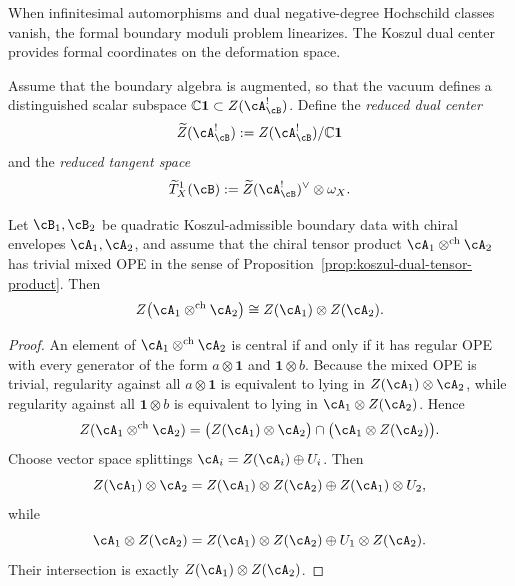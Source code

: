 \begin{remark}[Interpretation]
\label{rem:twisted-ym-central-formality-meaning}
When infinitesimal automorphisms and dual negative-degree Hochschild classes vanish, the formal boundary moduli problem linearizes. The Koszul dual center provides formal coordinates on the deformation space.
\end{remark}

\begin{definition}
\label{def:twisted-ym-reduced-center}
Assume that the boundary algebra is augmented, so that the vacuum defines a distinguished scalar subspace $\mathbb{C}\mathbf{1} \subset Z(\cA_{\cB}^{!})$. Define the \emph{reduced dual center}
\[
\widetilde Z(\cA_{\cB}^{!}) := Z(\cA_{\cB}^{!})/\mathbb{C}\mathbf{1}
\]
and the \emph{reduced tangent space}
\[
\widetilde T^1_X(\cB) := \widetilde Z(\cA_{\cB}^{!})^{\vee}\otimes \omega_X.
\]
\end{definition}

\begin{lemma}
\label{lem:twisted-ym-center-tensor}
Let $\cB_1,\cB_2$ be quadratic Koszul-admissible boundary data with chiral envelopes $\cA_1,\cA_2$, and assume that the chiral tensor product $\cA_1\otimes^{\mathrm{ch}}\cA_2$ has trivial mixed OPE\/ in the sense of Proposition~\ref{prop:koszul-dual-tensor-product}. Then
\[
Z\bigl(\cA_1\otimes^{\mathrm{ch}}\cA_2\bigr)
\cong
Z(\cA_1)\otimes Z(\cA_2).
\]
\end{lemma}

\begin{proof}
An element of $\cA_1\otimes^{\mathrm{ch}}\cA_2$ is central if and only if it has regular OPE with every generator of the form $a\otimes \mathbf{1}$ and $\mathbf{1}\otimes b$. Because the mixed OPE is trivial, regularity against all $a\otimes \mathbf{1}$ is equivalent to lying in $Z(\cA_1)\otimes \cA_2$, while regularity against all $\mathbf{1}\otimes b$ is equivalent to lying in $\cA_1\otimes Z(\cA_2)$. Hence
\[
Z(\cA_1\otimes^{\mathrm{ch}}\cA_2)
=
\bigl(Z(\cA_1)\otimes \cA_2\bigr)
\cap
\bigl(\cA_1\otimes Z(\cA_2)\bigr).
\]
Choose vector space splittings $\cA_i = Z(\cA_i)\oplus U_i$. Then
\[
Z(\cA_1)\otimes \cA_2
=
Z(\cA_1)\otimes Z(\cA_2)
\oplus
Z(\cA_1)\otimes U_2,
\]
while
\[
\cA_1\otimes Z(\cA_2)
=
Z(\cA_1)\otimes Z(\cA_2)
\oplus
U_1\otimes Z(\cA_2).
\]
Their intersection is exactly $Z(\cA_1)\otimes Z(\cA_2)$.
\end{proof}

